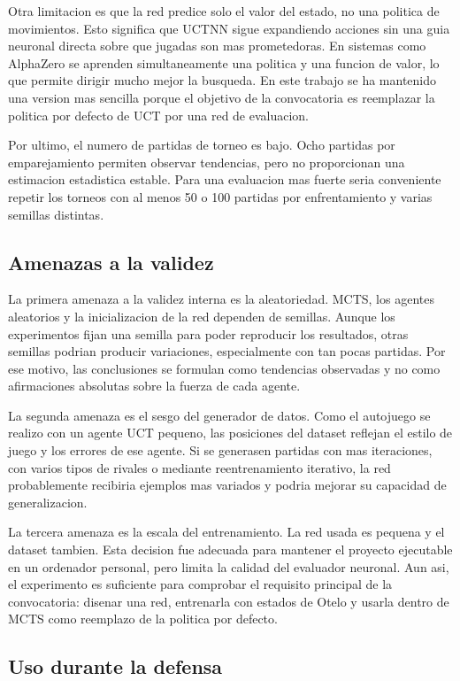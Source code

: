 \documentclass[conference,a4paper]{IEEEtran}
\begin{document}
Otra limitacion es que la red predice solo el valor del estado, no una politica
de movimientos. Esto significa que UCTNN sigue expandiendo acciones sin una guia
neuronal directa sobre que jugadas son mas prometedoras. En sistemas como
AlphaZero se aprenden simultaneamente una politica y una funcion de valor, lo
que permite dirigir mucho mejor la busqueda. En este trabajo se ha mantenido una
version mas sencilla porque el objetivo de la convocatoria es reemplazar la
politica por defecto de UCT por una red de evaluacion.

Por ultimo, el numero de partidas de torneo es bajo. Ocho partidas por
emparejamiento permiten observar tendencias, pero no proporcionan una estimacion
estadistica estable. Para una evaluacion mas fuerte seria conveniente repetir
los torneos con al menos 50 o 100 partidas por enfrentamiento y varias semillas
distintas.

\subsection{Amenazas a la validez}

La primera amenaza a la validez interna es la aleatoriedad. MCTS, los agentes
aleatorios y la inicializacion de la red dependen de semillas. Aunque los
experimentos fijan una semilla para poder reproducir los resultados, otras
semillas podrian producir variaciones, especialmente con tan pocas partidas. Por
ese motivo, las conclusiones se formulan como tendencias observadas y no como
afirmaciones absolutas sobre la fuerza de cada agente.

La segunda amenaza es el sesgo del generador de datos. Como el autojuego se
realizo con un agente UCT pequeno, las posiciones del dataset reflejan el estilo
de juego y los errores de ese agente. Si se generasen partidas con mas
iteraciones, con varios tipos de rivales o mediante reentrenamiento iterativo,
la red probablemente recibiria ejemplos mas variados y podria mejorar su
capacidad de generalizacion.

La tercera amenaza es la escala del entrenamiento. La red usada es pequena y el
dataset tambien. Esta decision fue adecuada para mantener el proyecto ejecutable
en un ordenador personal, pero limita la calidad del evaluador neuronal. Aun
asi, el experimento es suficiente para comprobar el requisito principal de la
convocatoria: disenar una red, entrenarla con estados de Otelo y usarla dentro
de MCTS como reemplazo de la politica por defecto.

\subsection{Uso durante la defensa}
\end{document}
